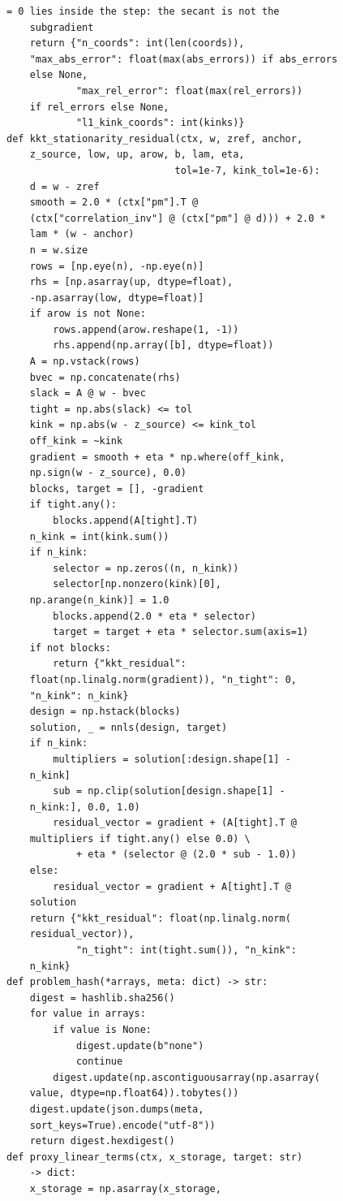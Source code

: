 \begin{multicols}{2}
\begin{Verbatim}[fontsize=\scriptsize]
    = 0 lies inside the step: the secant is not the
    subgradient
    return {"n_coords": int(len(coords)),
    "max_abs_error": float(max(abs_errors)) if abs_errors
    else None,
            "max_rel_error": float(max(rel_errors))
    if rel_errors else None,
            "l1_kink_coords": int(kinks)}
def kkt_stationarity_residual(ctx, w, zref, anchor,
    z_source, low, up, arow, b, lam, eta,
                             tol=1e-7, kink_tol=1e-6):
    d = w - zref
    smooth = 2.0 * (ctx["pm"].T @
    (ctx["correlation_inv"] @ (ctx["pm"] @ d))) + 2.0 *
    lam * (w - anchor)
    n = w.size
    rows = [np.eye(n), -np.eye(n)]
    rhs = [np.asarray(up, dtype=float),
    -np.asarray(low, dtype=float)]
    if arow is not None:
        rows.append(arow.reshape(1, -1))
        rhs.append(np.array([b], dtype=float))
    A = np.vstack(rows)
    bvec = np.concatenate(rhs)
    slack = A @ w - bvec
    tight = np.abs(slack) <= tol
    kink = np.abs(w - z_source) <= kink_tol
    off_kink = ~kink
    gradient = smooth + eta * np.where(off_kink,
    np.sign(w - z_source), 0.0)
    blocks, target = [], -gradient
    if tight.any():
        blocks.append(A[tight].T)
    n_kink = int(kink.sum())
    if n_kink:
        selector = np.zeros((n, n_kink))
        selector[np.nonzero(kink)[0],
    np.arange(n_kink)] = 1.0
        blocks.append(2.0 * eta * selector)
        target = target + eta * selector.sum(axis=1)
    if not blocks:
        return {"kkt_residual":
    float(np.linalg.norm(gradient)), "n_tight": 0,
    "n_kink": n_kink}
    design = np.hstack(blocks)
    solution, _ = nnls(design, target)
    if n_kink:
        multipliers = solution[:design.shape[1] -
    n_kink]
        sub = np.clip(solution[design.shape[1] -
    n_kink:], 0.0, 1.0)
        residual_vector = gradient + (A[tight].T @
    multipliers if tight.any() else 0.0) \
            + eta * (selector @ (2.0 * sub - 1.0))
    else:
        residual_vector = gradient + A[tight].T @
    solution
    return {"kkt_residual": float(np.linalg.norm(
    residual_vector)),
            "n_tight": int(tight.sum()), "n_kink":
    n_kink}
def problem_hash(*arrays, meta: dict) -> str:
    digest = hashlib.sha256()
    for value in arrays:
        if value is None:
            digest.update(b"none")
            continue
        digest.update(np.ascontiguousarray(np.asarray(
    value, dtype=np.float64)).tobytes())
    digest.update(json.dumps(meta,
    sort_keys=True).encode("utf-8"))
    return digest.hexdigest()
def proxy_linear_terms(ctx, x_storage, target: str)
    -> dict:
    x_storage = np.asarray(x_storage,

\end{Verbatim}
\end{multicols}
